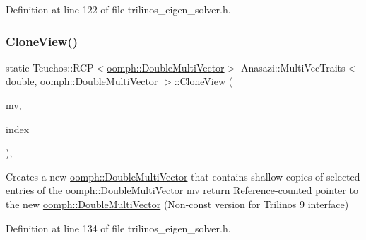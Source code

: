 Definition at line 122 of file trilinos\+\_\+eigen\+\_\+solver.\+h.

\mbox{\label{classAnasazi_1_1MultiVecTraits_3_01double_00_01oomph_1_1DoubleMultiVector_01_4_ac7847ef48e8b7577a7c66c57d82a614b}} 
\subsubsection{\texorpdfstring{Clone\+View()}{CloneView()}\hspace{0.1cm}{\footnotesize\ttfamily [2/3]}}
{\footnotesize\ttfamily static Teuchos\+::\+R\+CP$<$\hyperlink{classoomph_1_1DoubleMultiVector}{oomph\+::\+Double\+Multi\+Vector}$>$ Anasazi\+::\+Multi\+Vec\+Traits$<$ double, \hyperlink{classoomph_1_1DoubleMultiVector}{oomph\+::\+Double\+Multi\+Vector} $>$\+::Clone\+View (\begin{DoxyParamCaption}\item[{\hyperlink{classoomph_1_1DoubleMultiVector}{oomph\+::\+Double\+Multi\+Vector} \&}]{mv,  }\item[{const std\+::vector$<$ int $>$ \&}]{index }\end{DoxyParamCaption})\hspace{0.3cm}{\ttfamily [inline]}, {\ttfamily [static]}}



Creates a new \hyperlink{classoomph_1_1DoubleMultiVector}{oomph\+::\+Double\+Multi\+Vector} that contains shallow copies of selected entries of the \hyperlink{classoomph_1_1DoubleMultiVector}{oomph\+::\+Double\+Multi\+Vector} mv return Reference-\/counted pointer to the new \hyperlink{classoomph_1_1DoubleMultiVector}{oomph\+::\+Double\+Multi\+Vector} (Non-\/const version for Trilinos 9 interface) 



Definition at line 134 of file trilinos\+\_\+eigen\+\_\+solver.\+h.

\mbox{\label{classAnasazi_1_1MultiVecTraits_3_01double_00_01oomph_1_1DoubleMultiVector_01_4_a5499226f6f89fa68f1ba3e706d6c4642}} 
